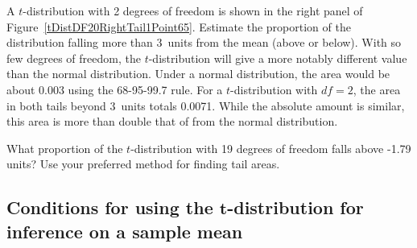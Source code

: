 \begin{examplewrap}
\begin{nexample}{A $t$-distribution with 2 degrees of freedom
    is shown in the right panel of
    Figure~\ref{tDistDF20RightTail1Point65}.
    Estimate the proportion of the distribution falling more
    than 3~units from the mean (above or below).}
  With so few degrees of freedom, the $t$-distribution will
  give a more notably different value than the normal
  distribution.
  Under a normal distribution, the area would be about
  0.003 using the 68-95-99.7 rule.
  For a $t$-distribution with $df = 2$, the area in both
  tails beyond 3~units totals 0.0071.
  While the absolute amount is similar, this area is more
  than double that of from the normal distribution.
\end{nexample}
\end{examplewrap}

\begin{exercisewrap}
\begin{nexercise}
What proportion of the $t$-distribution with 19 degrees
of freedom falls above -1.79 units?
Use your preferred method for finding tail areas.\footnotemark{}
\end{nexercise}
\end{exercisewrap}



\subsection{Conditions for using the $\mathbf{t}$-distribution
    for inference on a sample mean}
\label{tDistSolutionToSEProblem}

